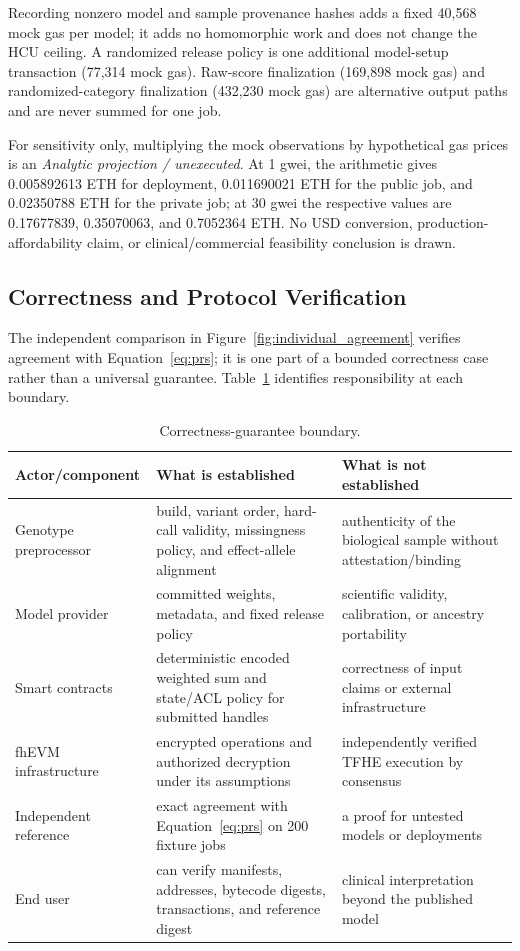 \documentclass[10pt,twocolumn]{article}
\begin{document}
Recording nonzero model and sample provenance hashes adds a fixed 40,568 mock gas per
model; it adds no homomorphic work and does not change the HCU ceiling.  A randomized
release policy is one additional model-setup transaction (77,314 mock gas).  Raw-score
finalization (169,898 mock gas) and randomized-category finalization (432,230 mock gas)
are alternative output paths and are never summed for one job.

For sensitivity only, multiplying the mock observations by hypothetical gas prices is
an \emph{Analytic projection / unexecuted}.  At 1 gwei, the arithmetic gives 0.005892613
ETH for deployment, 0.011690021 ETH for the public job, and 0.02350788 ETH for the
private job; at 30 gwei the respective values are 0.17677839, 0.35070063, and 0.7052364
ETH.  No USD conversion, production-affordability claim, or clinical/commercial
feasibility conclusion is drawn.

\subsection{Correctness and Protocol Verification}

The independent comparison in Figure~\ref{fig:individual_agreement} verifies agreement
with Equation~\ref{eq:prs}; it is one part of a bounded correctness case rather than a
universal guarantee.  Table~\ref{tab:correctness_boundary} identifies responsibility at
each boundary.

\begin{table}[t]
\centering
\caption{Correctness-guarantee boundary.}
\label{tab:correctness_boundary}
\small
\begin{tabularx}{\textwidth}{@{}p{3.2cm}XX@{}}
\toprule
\textbf{Actor/component} & \textbf{What is established} & \textbf{What is not established} \\
\midrule
Genotype preprocessor & build, variant order, hard-call validity, missingness policy, and effect-allele alignment & authenticity of the biological sample without attestation/binding \\
Model provider & committed weights, metadata, and fixed release policy & scientific validity, calibration, or ancestry portability \\
Smart contracts & deterministic encoded weighted sum and state/ACL policy for submitted handles & correctness of input claims or external infrastructure \\
fhEVM infrastructure & encrypted operations and authorized decryption under its assumptions & independently verified TFHE execution by consensus \\
Independent reference & exact agreement with Equation~\ref{eq:prs} on 200 fixture jobs & a proof for untested models or deployments \\
End user & can verify manifests, addresses, bytecode digests, transactions, and reference digest & clinical interpretation beyond the published model \\
\bottomrule
\end{tabularx}
\end{table}
\end{document}
